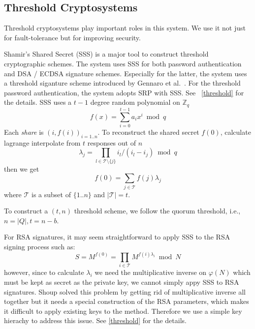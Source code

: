 \subsection{Threshold Cryptosystems}
Threshold cryptosystems play important roles in this system. We use it
not just for fault-tolerance but for improving security.

Shamir's Shared Secret (SSS) is a major tool to construct threshold
cryptographic schemes. The system uses SSS for both password
authentication and DSA / ECDSA signature schemes. Especially for the
latter, the system uses a threshold siganture scheme introduced by
Gennaro et al.\ \cite{Gennaro}. For the threshold password
authentication, the system adopts SRP \cite{srp} with SSS. See
~\ref{threshold} for the details.
SSS uses a $t-1$ degree random polynomial on $\mathbb{Z}_q$
\[
  f(x) = \sum_{i=0}^{t-1}a_ix^i \bmod q
\]
Each {\em share} is $(i, f(i))_{i = 1..n}$. To reconstruct the shared
secret $f(0)$, calculate lagrange interpolate from $t$ responses out
of $n$
\[
    \lambda_j = \prod_{l \in \mathcal{T} \setminus \{j\}}
    i_l / (i_l - i_j) \bmod q
\]
then we get
\[
  f(0) = \sum_{j \in \mathcal{T}} f(j)\lambda_j
\]
where $\mathcal{T}$ is a subset of $\{1..n\}$ and $|\mathcal{T}| =
t$.

To construct a $(t, n)$ threshold scheme, we follow the quorum
threshold, i.e., $n = |Q|, t = n-b$.

For RSA signatures, it may seem straightforward to apply SSS to the
RSA signing process such as:
\[ S = M^{f(0)} = \prod_{i \in \mathcal{T}} M^{f(i)\lambda_i} \bmod N \]
however, since to calculate $\lambda_i$ we need the multiplicative
inverse on $\varphi(N)$ which must be kept as secret as the private
key, we cannot simply appy SSS to RSA signatures. Shoup \cite{shoup}
solved this problem by getting rid of multiplicative inverse all
together but it needs a special construction of the RSA parameters,
which makes it difficult to apply existing keys to the
method. Therefore we use a simple key hierachy to address this
issue. See \ref{threshold} for the details.

